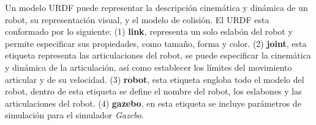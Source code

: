 Un modelo URDF puede representar la descripción cinemática y dinámica de un robot, su 
representación visual, y el modelo de colisión. El URDF esta conformado por lo siguiente: 
(1) \textbf{link}, representa un solo eslabón del robot y permite especificar sus propiedades, 
como tamaño, forma y color. (2) \textbf{joint}, esta etiqueta representa las articulaciones del 
robot, se puede especificar la cinemática y dinámica de la articulación, así como establecer 
los límites del movimiento articular y de su velocidad. (3) \textbf{robot}, esta etiqueta 
engloba todo el modelo del robot, dentro de esta etiqueta se define el nombre del robot, los 
eslabones y las articulaciones del robot. (4) \textbf{gazebo}, en esta etiqueta se incluye 
parámetros de simulación para el simulador \textit{Gazebo}.







